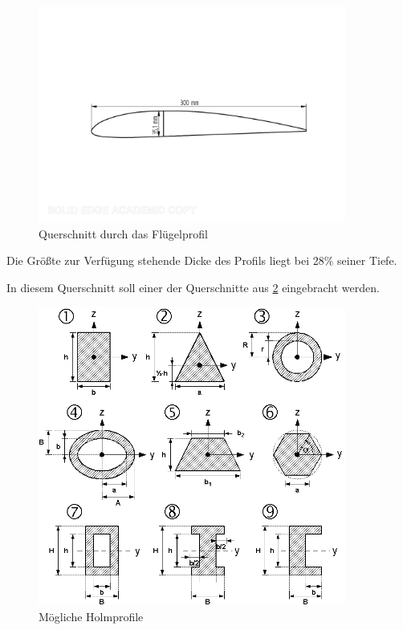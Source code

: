 \begin{figure}[H]
\centering
\includegraphics[width=0.9\textwidth, trim={15mm 40mm 15mm 40mm},clip]{bilder/Fotos/Tragflaechensegment.pdf}
\caption{Querschnitt durch das Flügelprofil} 
\label{fig:Querschnitt durch das Flügelprofil}
\end{figure}
Die Größte zur Verfügung stehende Dicke des Profils liegt bei 28\% seiner Tiefe.

In diesem Querschnitt soll einer der Querschnitte aus \ref{fig:Mögliche Holmprofile} eingebracht werden.

\begin{figure}[H]
\centering
\includegraphics[width=0.9\textwidth]{bilder/Fotos/Flaechentraegheitsmoment2.png}
\caption{Mögliche Holmprofile} 
\label{fig:Mögliche Holmprofile}
\end{figure}

